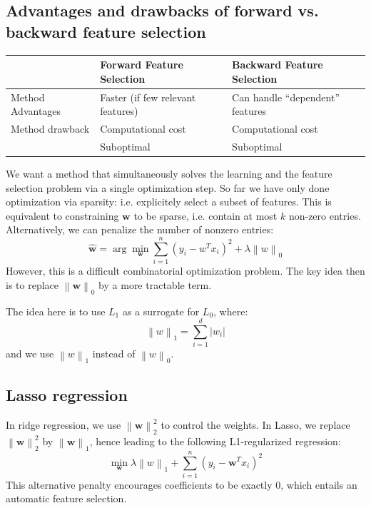 \documentclass[a4paper,10pt,twoside]{article}
\newcommand\norm[1]{\left\lVert#1\right\rVert}
\begin{document}
\subsection{Advantages and drawbacks of forward vs. backward feature selection}
\begin{table}[htbp]
    \centering
    \begin{tabular}{lll}
        \toprule
        & Forward Feature Selection & Backward Feature Selection\\
        \midrule
        Method Advantages & Faster (if few relevant features) & Can handle ``dependent'' features\\
        \midrule
        Method drawback & Computational cost & Computational cost \\
        \midrule
        & Suboptimal & Suboptimal \\
        \bottomrule
    \end{tabular}
\end{table}

We want a method that simultaneously solves the learning and the feature selection problem via a single optimization step. So far we have only done optimization via sparsity: i.e. explicitely select a subset of features. This is equivalent to constraining $\mathbf{w}$ to be sparse, i.e. contain at most $k$ non-zero entries. Alternatively, we can penalize the number of nonzero entries:
\begin{equation*}
    \hat{\mathbf{w}} = \arg\min_{\mathbf{w}}\sum_{i=1}^{n}(y_i-w^Tx_i)^2+\lambda \norm{w}_0
\end{equation*}
However, this is a difficult combinatorial optimization problem. The key idea then is to replace $\norm{\mathbf{w}}_0$ by a more tractable term.

The idea here is to use $L_1$ as a surrogate for $L_0$, where:
\begin{equation*}
    \norm{w}_1=\sum_{i=1}^{d}|w_i|
\end{equation*}
and we use $\norm{w}_1$ instead of $\norm{w}_0$.

\subsection{Lasso regression}

In ridge regression, we use $\norm{\mathbf{w}}_2^2$ to control the weights. In Lasso, we replace $\norm{\mathbf{w}}_2^2$ by $\norm{\mathbf{w}}_1$, hence leading to the following L1-regularized regression:
\begin{equation*}
    \min_{\mathbf{w}}\lambda\norm{w}_1+\sum_{i=1}^{n}(y_i-\mathbf{w}^Tx_i)^2
\end{equation*}
This alternative penalty encourages coefficients to be exactly 0, which entails an automatic feature selection.
\end{document}
